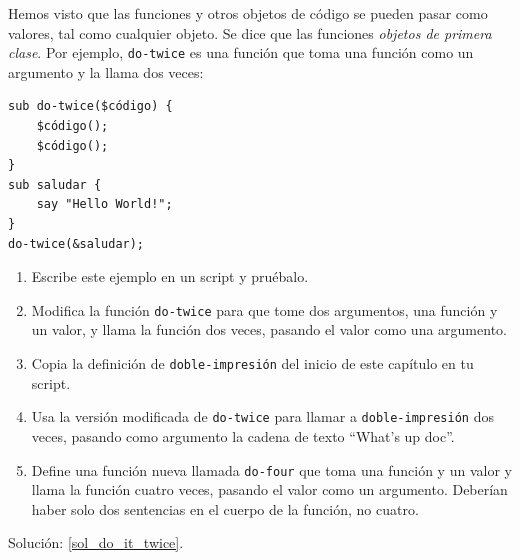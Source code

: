 \begin{exercise}
\label{do_it_twice}

Hemos visto que las funciones y otros objetos de código 
se pueden pasar como valores, tal como cualquier objeto. Se dice
que las funciones \emph{objetos de primera clase}. Por ejemplo, 
\verb|do-twice| es una función que toma una función como un
argumento y la llama dos veces:

\begin{lstlisting}
sub do-twice($código) {
    $código(); 
    $código();
}
sub saludar {
    say "Hello World!";
}
do-twice(&saludar);
\end{lstlisting}

\begin{enumerate}

\item Escribe este ejemplo en un script y 
pruébalo.

\item Modifica la función \verb|do-twice| para que tome
dos argumentos, una función y un valor, y llama la función
dos veces, pasando el valor como una argumento.

\item Copia la definición de \verb|doble-impresión| del 
inicio de este capítulo en tu script.

\item Usa la versión modificada de \verb|do-twice| para llamar
a \verb|doble-impresión| dos veces, pasando como argumento
la cadena de texto ``What's up doc''.

\item Define una función nueva llamada \verb|do-four|
que toma una función y un valor y llama la función
cuatro veces, pasando el valor como un argumento. Deberían
haber solo dos sentencias en el cuerpo de la función, no cuatro.

\end{enumerate}

Solución: \ref{sol_do_it_twice}.

\end{exercise}



